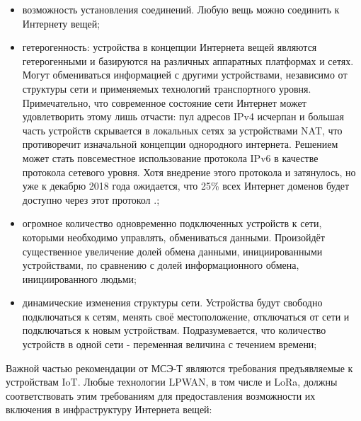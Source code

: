 \begin{itemize}
	\item возможность установления соединений. Любую вещь можно соединить к Интернету вещей;
	\item гетерогенность: устройства в концепции Интернета вещей являются гетерогенными и базируются на различных аппаратных платформах и сетях. 
		Могут обмениваться информацией с другими устройствами, независимо от структуры сети и применяемых технологий транспортного уровня. 
		Примечательно, что современное состояние сети Интернет может удовлетворить этому лишь отчасти: пул адресов IPv4 исчерпан и большая часть устройств скрывается в локальных сетях за устройствами NAT, что противоречит изначальной концепции однородного интернета. 
		Решением может стать повсеместное использование протокола IPv6 в качестве протокола сетевого уровня. 
		Хотя внедрение этого протокола и затянулось, но уже к декабрю 2018 года ожидается, что 25\% всех Интернет доменов будет доступно через этот протокол \cite{pickard2017}.;
	\item огромное количество одновременно подключенных устройств к сети, 
которыми необходимо управлять, обмениваться данными. Произойдёт существенное 
увеличение долей обмена данными, инициированными устройствами, по сравнению с 
долей информационного обмена, инициированного людьми;
	\item динамические изменения структуры сети. Устройства будут свободно подключаться к сетям, менять своё местоположение, отключаться от сети и подключаться к новым устройствам. Подразумевается, что количество устройств в одной сети - переменная величина с течением времени;
\end{itemize}

Важной частью рекомендации от МСЭ-Т являются требования	предъявляемые к устройствам IoT. Любые технологии LPWAN, в том числе и LoRa, должны соответствовать этим требованиям для предоставления возможности их включения в инфраструктуру Интернета вещей:

